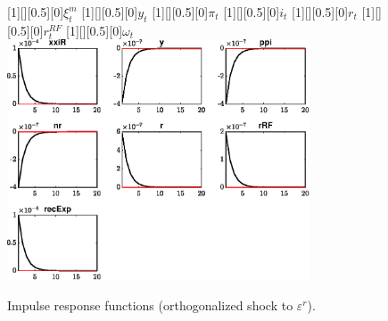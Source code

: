 \begin{figure}[H]
[1][][0.5][0]{$\xi^m_t$}
[1][][0.5][0]{$y_t$}
[1][][0.5][0]{$\pi_t$}
[1][][0.5][0]{$i_t$}
[1][][0.5][0]{$r_t$}
[1][][0.5][0]{$r^{RF}_t$}
[1][][0.5][0]{$\omega_t$}
\centering 
\includegraphics[width=0.80\textwidth]{risky_ClosedEconomy/graphs/risky_ClosedEconomy_IRF_eepsR}
\caption{Impulse response functions (orthogonalized shock to ${\varepsilon^{r}}$).}
\label{Fig:IRF:eepsR}
\end{figure}
 
 
